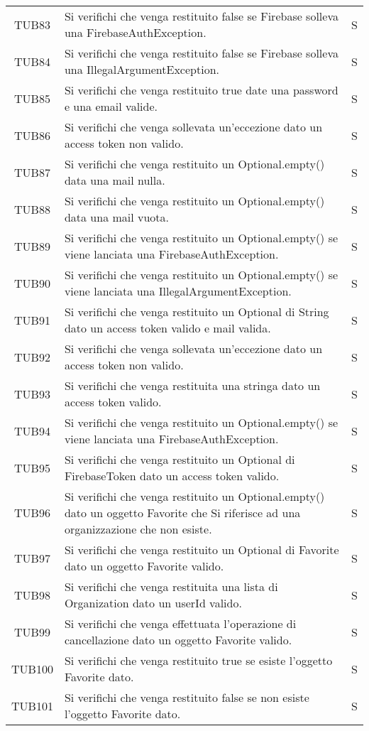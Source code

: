 {\begin{longtable}{ c C{13cm} C{1cm}}
TUB83 & Si verifichi che venga restituito false se Firebase solleva una FirebaseAuthException. & S \\
TUB84 & Si verifichi che venga restituito false se Firebase solleva una IllegalArgumentException. & S \\
TUB85 & Si verifichi che venga restituito true date una password e una email valide. & S \\
TUB86 & Si verifichi che venga sollevata un'eccezione dato un access token non valido. & S \\
TUB87 & Si verifichi che venga restituito un Optional.empty() data una mail nulla. & S \\
TUB88 & Si verifichi che venga restituito un Optional.empty() data una mail vuota. & S \\
TUB89 & Si verifichi che venga restituito un Optional.empty() se viene lanciata una FirebaseAuthException. & S \\
TUB90 & Si verifichi che venga restituito un Optional.empty() se viene lanciata una IllegalArgumentException. & S \\
TUB91 & Si verifichi che venga restituito un Optional di String dato un access token valido e mail valida. & S \\
TUB92 & Si verifichi che venga sollevata un'eccezione dato un access token non valido. & S \\
TUB93 & Si verifichi che venga restituita una stringa dato un access token valido. & S \\
TUB94 & Si verifichi che venga restituito un Optional.empty() se viene lanciata una FirebaseAuthException. & S \\
TUB95 & Si verifichi che venga restituito un Optional di FirebaseToken dato un access token valido. & S \\
TUB96 & Si verifichi che venga restituito un Optional.empty() dato un oggetto Favorite che Si riferisce ad una organizzazione che non esiste. & S \\
TUB97 & Si verifichi che venga restituito un Optional di Favorite dato un oggetto Favorite valido. & S \\
TUB98 & Si verifichi che venga restituita una lista di Organization dato un userId valido. & S \\
TUB99 & Si verifichi che venga effettuata l'operazione di cancellazione dato un oggetto Favorite valido. & S \\
TUB100 & Si verifichi che venga restituito true se esiste l'oggetto Favorite dato. & S \\
TUB101 & Si verifichi che venga restituito false se non esiste l'oggetto Favorite dato. & S \\

\end{longtable}}
